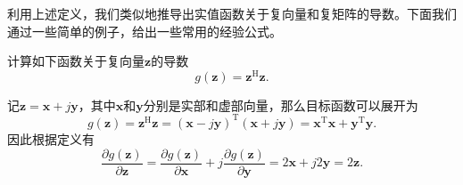 利用上述定义，我们类似地推导出实值函数关于复向量和复矩阵的导数。下面我们通过一些简单的例子，给出一些常用的经验公式。

\begin{example}
    计算如下函数关于复向量\( \bm{z} \)的导数
    \[
        g(\bm{z}) = \bm{z}^{\mathrm{H}} \bm{z}.
    \]
\end{example}
\begin{solution}
    记\( \bm{z} = \bm{x} + j \bm{y} \)，其中\( \bm{x} \)和\( \bm{y} \)分别是实部和虚部向量，那么目标函数可以展开为
    \[
        g(\bm{z}) = \bm{z}^{\mathrm{H}} \bm{z} = (\bm{x} - j \bm{y})^{\mathrm{T}} (\bm{x} + j \bm{y}) = \bm{x}^{\mathrm{T}} \bm{x} + \bm{y}^{\mathrm{T}} \bm{y}.
    \]
    因此根据定义有
    \[
        \frac{\partial g(\bm{z})}{\partial \bm{z}} = \frac{\partial g(\bm{z})}{\partial \bm{x}} + j \frac{\partial g(\bm{z})}{\partial \bm{y}} = 2\bm{x} + j 2\bm{y} = 2\bm{z}.
    \]
\end{solution}

